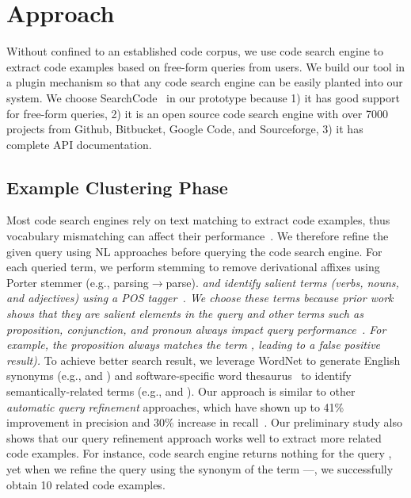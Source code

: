 


\section{Approach}
Without confined to an established code corpus, we use code search engine to extract code examples based on free-form queries from users.  We build our tool in a plugin mechanism so that any code search engine can be easily planted into our system.  
We choose SearchCode~\cite{SearchCode} in our prototype because 1) it has good support for free-form queries,  2) it is an open source code search engine with over 7000 projects from  Github, Bitbucket, Google Code, and Sourceforge, 3) it has complete API documentation. 

\subsection{Example Clustering Phase}  

  Most code search engines rely on text matching to extract code examples, thus vocabulary mismatching can affect their performance~\cite{Hill:NLQueryRefine14}. We therefore refine the given query using NL approaches before querying the code search engine. 
For each queried term, we perform stemming to remove derivational affixes using Porter stemmer\cite{porter:stemmer} (e.g., parsing$\rightarrow$parse).  \textit{and identify salient terms (verbs, nouns, and adjectives) using a POS tagger~\cite{postagger04:stanford}. We choose these terms because prior work shows that they are salient elements in the query and other terms such as proposition, conjunction, and pronoun always impact query performance~\cite{Hill:NLQueryRefine14}. For example, the proposition  always matches the term , leading to a false positive result). }
To achieve better search result, we leverage  WordNet to generate English synonyms (e.g.,  and ) and software-specific word thesaurus~\cite{yangMSR12:semWord, SEWordSim:ICSE14} to identify semantically-related terms (e.g.,  and ). Our  approach is similar to other \textit{automatic query refinement} approaches, which have shown up to 41\% improvement in precision and 30\% increase in recall~\cite{lopes:queryExpand14, Marcus:queryReform13}. 
Our preliminary study also shows that our query refinement approach works well to extract more related code examples. For instance, code search engine returns nothing for the query , yet when we refine the query using  the synonym of the term ---, we successfully obtain 10 related code examples. 

